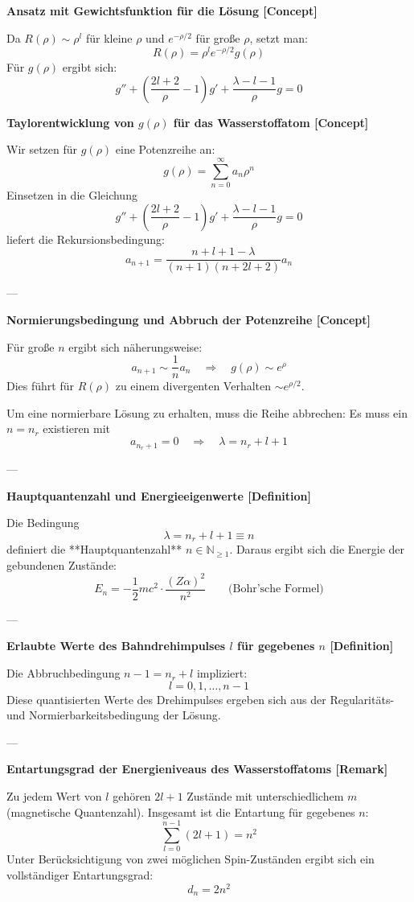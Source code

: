 \documentclass[10pt, letterpaper]{article}
\begin{document}
\textbf{Ansatz mit Gewichtsfunktion für die Lösung [Concept]}

Da $R(\rho) \sim \rho^l$ für kleine $\rho$ und $e^{-\rho/2}$ für große $\rho$, setzt man:
\[
R(\rho) = \rho^l e^{-\rho/2} g(\rho)
\]
Für $g(\rho)$ ergibt sich:
\[
g'' + \left( \frac{2l+2}{\rho} - 1 \right) g' + \frac{\lambda - l - 1}{\rho} g = 0
\]



\textbf{Taylorentwicklung von $g(\rho)$ für das Wasserstoffatom [Concept]}

Wir setzen für $g(\rho)$ eine Potenzreihe an:
\[
g(\rho) = \sum_{n=0}^\infty a_n \rho^n
\]
Einsetzen in die Gleichung
\[
g'' + \left( \frac{2l+2}{\rho} - 1 \right) g' + \frac{\lambda - l - 1}{\rho} g = 0
\]
liefert die Rekursionsbedingung:
\[
a_{n+1} = \frac{n + l + 1 - \lambda}{(n+1)(n + 2l + 2)} a_n
\]

---

\textbf{Normierungsbedingung und Abbruch der Potenzreihe [Concept]}

Für große $n$ ergibt sich näherungsweise:
\[
a_{n+1} \sim \frac{1}{n} a_n \quad \Rightarrow \quad g(\rho) \sim e^{\rho}
\]
Dies führt für $R(\rho)$ zu einem divergenten Verhalten $\sim e^{\rho/2}$.

Um eine normierbare Lösung zu erhalten, muss die Reihe abbrechen: Es muss ein $n = n_r$ existieren mit
\[
a_{n_r + 1} = 0 \quad \Rightarrow \quad \lambda = n_r + l + 1
\]

---

\textbf{Hauptquantenzahl und Energieeigenwerte [Definition]}

Die Bedingung
\[
\lambda = n_r + l + 1 \equiv n
\]
definiert die **Hauptquantenzahl** \( n \in \mathbb{N}_{\geq 1} \). Daraus ergibt sich die Energie der gebundenen Zustände:
\[
E_n = -\frac{1}{2} m c^2 \cdot \frac{(Z \alpha)^2}{n^2} \qquad \text{(Bohr'sche Formel)}
\]

---

\textbf{Erlaubte Werte des Bahndrehimpulses $l$ für gegebenes $n$ [Definition]}

Die Abbruchbedingung $n - 1 = n_r + l$ impliziert:
\[
l = 0, 1, \dotsc, n-1
\]
Diese quantisierten Werte des Drehimpulses ergeben sich aus der Regularitäts- und Normierbarkeitsbedingung der Lösung.

---

\textbf{Entartungsgrad der Energieniveaus des Wasserstoffatoms [Remark]}

Zu jedem Wert von $l$ gehören $2l+1$ Zustände mit unterschiedlichem $m$ (magnetische Quantenzahl). Insgesamt ist die Entartung für gegebenes $n$:
\[
\sum_{l=0}^{n-1} (2l+1) = n^2
\]
Unter Berücksichtigung von zwei möglichen Spin-Zuständen ergibt sich ein vollständiger Entartungsgrad:
\[
d_n = 2n^2
\]
\end{document}
